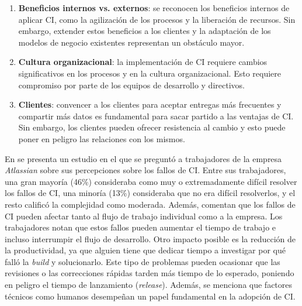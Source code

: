\begin{enumerate}
	\item \textbf{Beneficios internos vs. externos}: se reconocen los beneficios internos de
      aplicar CI, como la agilización de los procesos y la liberación de recursos. Sin
      embargo, extender estos beneficios a los clientes y la adaptación de los modelos de negocio
      existentes representan un obstáculo mayor.
	\item \textbf{Cultura organizacional}: la implementación de CI requiere cambios
      significativos en los procesos y en la cultura organizacional. Esto requiere compromiso por
      parte de los equipos de desarrollo y directivos.
	\item \textbf{Clientes}: convencer a los clientes para aceptar entregas más frecuentes y
      compartir más datos es fundamental para sacar partido a las ventajas de CI. Sin
      embargo, los clientes pueden ofrecer resistencia al cambio y esto puede poner en peligro
      las relaciones con los mismos.
\end{enumerate}

En \cite{17} se presenta un estudio en el que se preguntó a trabajadores de la empresa
\textit{Atlassian} sobre sus percepciones sobre los fallos de CI. Entre sus trabajadores,
una gran mayoría (46\%) consideraba como muy o extremadamente difícil resolver los fallos de
CI, una minoría (13\%) consideraba que no era difícil resolverlos, y el resto calificó
la complejidad como moderada. Además, comentan que los fallos de CI pueden afectar tanto
al flujo de trabajo individual como a la empresa. Los trabajadores notan que estos fallos pueden
aumentar el tiempo de trabajo e incluso interrumpir el flujo de desarrollo. Otro impacto posible
es la reducción de la productividad, ya que alguien tiene que dedicar tiempo a investigar por qué
falló la \textit{build} y solucionarlo. Este tipo de problemas pueden ocasionar que las revisiones
o las correcciones rápidas tarden más tiempo de lo esperado, poniendo en peligro el tiempo de
lanzamiento (\textit{release}). Además, se menciona que factores técnicos como humanos desempeñan
un papel fundamental en la adopción de CI.\\

